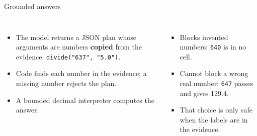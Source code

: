 \documentclass[aspectratio=169,11pt]{beamer}
\newcommand{\pos}[1]{\textcolor{deporange}{\textbf{#1}}}
\begin{document}
\begin{frame}{Grounded answers}
\begin{columns}[T]
\small
\begin{itemize}\itemsep5pt
\item The model returns a JSON plan whose arguments are numbers \pos{copied} from the evidence: \texttt{divide("637", "5.0")}.
\item Code finds each number in the evidence; a missing number rejects the plan.
\item A bounded decimal interpreter computes the answer.
\end{itemize}
\small
\begin{itemize}\itemsep5pt
\item Blocks invented numbers: \texttt{640} is in no cell.
\item Cannot block a wrong real number: \texttt{647} passes and gives 129.4.
\item That choice is only safe when the labels are in the evidence.
\end{itemize}
\end{columns}
\end{frame}
\end{document}
